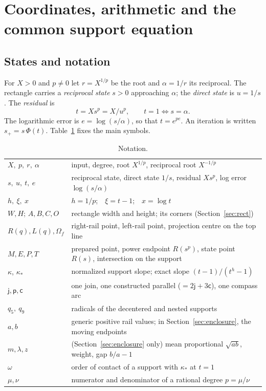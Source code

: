 \documentclass[10pt,a4paper]{article}
\theoremstyle{plain}
\theoremstyle{remark}
\numberwithin{equation}{section}
\newcommand{\jn}{\mathsf{j}}          %
\newcommand{\pl}{\mathsf{p}}          %
\newcommand{\ar}{\mathsf{c}}          %
\newcommand{\Om}{\Omega}              %
\begin{document}
\section{Coordinates, arithmetic and the common support equation}\label{sec:coords}

\subsection{States and notation}

For $X>0$ and $p\neq 0$ let $r=X^{1/p}$ be the root and $\alpha=1/r$ its reciprocal. The rectangle
carries a \emph{reciprocal state} $s>0$ approaching $\alpha$; the \emph{direct state} is $u=1/s$. The
\emph{residual} is
\[ t=Xs^{p}=X/u^{p}, \qquad t=1 \iff s=\alpha . \]
The logarithmic error is $e=\log(s/\alpha)$, so that $t=e^{pe}$. An iteration is written
$s_+=s\,\Phi(t)$. Table~\ref{tab:notation} fixes the main symbols.

\begin{table}[h]
\centering\small
\caption{Notation.}\label{tab:notation}
\begin{tabularx}{\linewidth}{@{}lX@{}}
\toprule
$X,\ p,\ r,\ \alpha$ & input, degree, root $X^{1/p}$, reciprocal root $X^{-1/p}$\\
$s,\ u,\ t,\ e$ & reciprocal state, direct state $1/s$, residual $Xs^p$, log error $\log(s/\alpha)$\\
$h,\ \xi,\ x$ & $h=1/p$;\ \ $\xi=t-1$;\ \ $x=\log t$\\
$W,H$; $A,B,C,O$ & rectangle width and height; its corners (Section~\ref{sec:rect})\\
$R(q),L(q),\Om_f$ & right-rail point, left-rail point, projection centre on the top line\\
$M,E,P,T$ & prepared point, power endpoint $R(s^{p})$, state point $R(s)$, intersection on the support\\
$\kappa$, $\kappa_*$ & normalized support slope; exact slope $(t-1)/(t^{h}-1)$\\
$\jn,\pl,\ar$ & one join, one constructed parallel ($=2\jn+3\ar$), one compass arc\\
$q_5,\ q_9$ & radicals of the decentered and nested supports\\
$a,b$ & generic positive rail values; in Section~\ref{sec:enclosure}, the moving endpoints\\
$m,\lambda,z$ & (Section~\ref{sec:enclosure} only) mean proportional $\sqrt{ab}$, weight, gap $b/a-1$\\
$\omega$ & order of contact of a support with $\kappa_*$ at $t=1$\\
$\mu,\nu$ & numerator and denominator of a rational degree $p=\mu/\nu$\\
\bottomrule
\end{tabularx}
\end{table}
\end{document}
